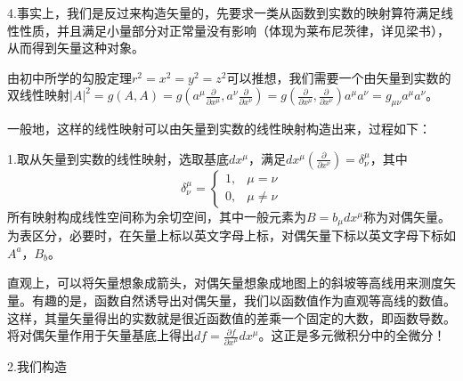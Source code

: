 \documentclass{article}
\begin{document}
4.事实上，我们是反过来构造矢量的，先要求一类从函数到实数的映射算符满足线性性质，并且满足小量部分对正常量没有影响（体现为莱布尼茨律，详见梁书），从而得到矢量这种对象。

由初中所学的勾股定理$r^2=x^2=y^2=z^2$可以推想，我们需要一个由矢量到实数的双线性映射$|A|^2=g(A,A)=g(a^\mu \frac{\partial}{\partial x^\mu },a^\nu \frac{\partial}{\partial x^\nu })=g( \frac{\partial}{\partial x^\mu }, \frac{\partial}{\partial x^\nu})a^\mu a^\nu=g_{\mu \nu }a^\mu a^\nu $。

一般地，这样的线性映射可以由矢量到实数的线性映射构造出来，过程如下：

1.取从矢量到实数的线性映射，选取基底$dx^\mu $，满足$dx^\mu (\frac{\partial}{\partial x^\nu })=\delta ^\mu _\nu$，其中
\begin{equation*}
    \delta ^\mu _\nu =
    \begin{cases}
    1,&\mu=\nu
    \\0,&\mu\neq \nu
\end{cases}
\end{equation*}
所有映射构成线性空间称为余切空间，其中一般元素为$B=b_\mu dx^\mu $称为对偶矢量。为表区分，必要时，在矢量上标以英文字母上标，对偶矢量下标以英文字母下标如$A^a$，$B_b$。

直观上，可以将矢量想象成箭头，对偶矢量想象成地图上的斜坡等高线用来测度矢量。有趣的是，函数自然诱导出对偶矢量，我们以函数值作为直观等高线的数值。这样，其量矢量得出的实数就是很近函数值的差乘一个固定的大数，即函数导数。将对偶矢量作用于矢量基底上得出$df=\frac{\partial f}{\partial x^\mu }dx^\mu $。这正是多元微积分中的全微分！

2.我们构造
\end{document}
